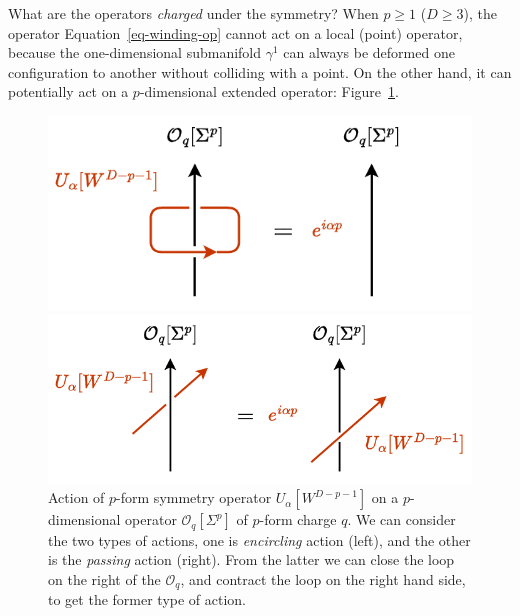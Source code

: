 \documentclass[11pt,toc=bibliography]{scrbook}
\newcommand{\stdim}{D}
\numberwithin{equation}{section}
\newcommand{\stdim}{D}
\begin{document}
What are the operators \emph{charged} under the symmetry? When
\(p \ge 1\) (\(\stdim\ge 3\)), the operator Equation~\ref{eq-winding-op}
cannot act on a local (point) operator, because the one-dimensional
submanifold \(\gamma^1\) can always be deformed one configuration to
another without colliding with a point. On the other hand, it can
potentially act on a \(p\)-dimensional extended operator:
Figure~\ref{fig-one-form}.

\begin{figure}[t]

\begin{minipage}{0.50\linewidth}
\includegraphics{figures/one-form_act.pdf}\end{minipage}%
%
\begin{minipage}{0.50\linewidth}
\includegraphics{figures/one_form_passing.pdf}\end{minipage}%

\caption{\label{fig-one-form}Action of \(p\)-form symmetry operator
\(U_\alpha[W^{D-p-1}]\) on a \(p\)-dimensional operator
\(\mathcal{O}_q[\Sigma^p]\) of \(p\)-form charge \(q\). We can consider
the two types of actions, one is \emph{encircling} action (left), and
the other is the \emph{passing} action (right). From the latter we can
close the loop on the right of the \(\mathcal{O}_q\), and contract the
loop on the right hand side, to get the former type of action.}

\end{figure}%
\end{document}
